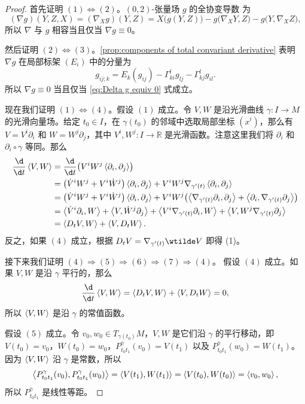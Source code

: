 \begin{proof}
  首先证明 $(1)\Leftrightarrow (2)$。$(0,2)$-张量场 $g$ 的全协变导数
  为
  \[
    (\nabla g)(Y,Z,X)=(\nabla_Xg)(Y,Z)  
    =X\bigl(g(Y,Z)\bigr)-g\bigl(\nabla_XY,Z\bigr)
    -g\bigl(Y,\nabla_XZ\bigr),
  \]
  所以 $\nabla$ 与 $g$ 相容当且仅当 $\nabla g\equiv 0$。

  然后证明 $(2)\Leftrightarrow (3)$。\autoref{prop:components of total convariant derivative}
  表明 $\nabla g$ 在局部标架 $(E_i)$ 中的分量为
  \[
    g_{ij;k}=E_k(g_{ij})-\Gamma_{ki}^lg_{lj}-\Gamma_{kj}^lg_{il}.  
  \]
  所以 $\nabla g\equiv 0$ 当且仅当 \eqref{eq:Delta g equiv 0} 式成立。

  现在我们证明 $(1)\Leftrightarrow (4)$。假设 $(1)$ 成立。令 $V,W$
  是沿光滑曲线 $\gamma:I\to M$ 的光滑向量场。给定 $t_0\in I$，在 $\gamma(t_0)$
  的邻域中选取局部坐标 $(x^i)$，那么有 $V=V^i\partial_i$ 和 $W=W^j\partial_j$，其中 $V^i,W^j:I\to \mathbb{R}$
  是光滑函数。注意这里我们将 $\partial_i$ 和 $\partial_i\circ\gamma$ 等同。那么
  \begin{align*}
    \frac{\d}{\d t}\inn{V,W}&=\frac{\d}{\d t}\bigl(V^iW^j\inn{\partial_i,\partial_j}\bigr)\\
    &=\bigl(\dot V^iW^j+V^i\dot W^j\bigr)\inn{\partial_i,\partial_j}+
    V^iW^j \nabla_{\gamma'(t)}\inn{\partial_i,\partial_j}\\
    &=\bigl(\dot V^iW^j+V^i\dot W^j\bigr)\inn{\partial_i,\partial_j}+V^iW^j
    \bigl(\inn{\nabla_{\gamma'(t)}\partial_i,\partial_j}+\inn{\partial_i,\nabla_{\gamma'(t)}\partial_j}\bigr)
    \\
    &=\inn{\dot V^i\partial_i,W}+\inn{V,\dot W^j\partial_j}+
    \inn{V^i\nabla_{\gamma'(t)}\partial_i,W}+\inn{V,W^j\nabla_{\gamma'(t)}\partial_j}\\
    &=\inn{D_tV,W}+\inn{V,D_tW}.
  \end{align*}
  反之，如果 $(4)$ 成立，根据 $D_tV=\nabla_{\gamma'(t)}\wtilde V$ 即得 (1)。

  接下来我们证明 $(4)\Rightarrow (5)\Rightarrow(6)\Rightarrow(7)\Rightarrow(4)$。
  假设 $(4)$ 成立。如果 $V,W$ 是沿 $\gamma$ 平行的，那么
  \[
    \frac{\d}{\d t}\inn{V,W}=\inn{D_tV,W}+\inn{V,D_tW}=0,
  \]
  所以 $\left\langle V,W\right\rangle$ 是沿 $\gamma$ 的常值函数。

  假设 $(5)$ 成立。令 $v_0,w_0\in T_{\gamma(t_0)}M$，$V,W$ 是它们沿
  $\gamma$ 的平行移动，即 $V(t_0)=v_0$，$W(t_0)=w_0$，$P_{t_0t_1}^\gamma(v_0)=V(t_1)$
  以及 $P_{t_0t_1}^\gamma(w_0)=W(t_1)$。因为 $\left\langle V,W\right\rangle$ 沿 $\gamma$ 是常数，所以
  \[
    \left\langle P_{t_0t_1}^\gamma(v_0),P_{t_0t_1}^\gamma(w_0)\right\rangle  
    =\left\langle V(t_1),W(t_1)\right\rangle=\left\langle V(t_0),W(t_0)\right\rangle=\left\langle v_0,w_0\right\rangle,
  \]
  所以 $P_{t_0t_1}^\gamma$ 是线性等距。


\end{proof}
